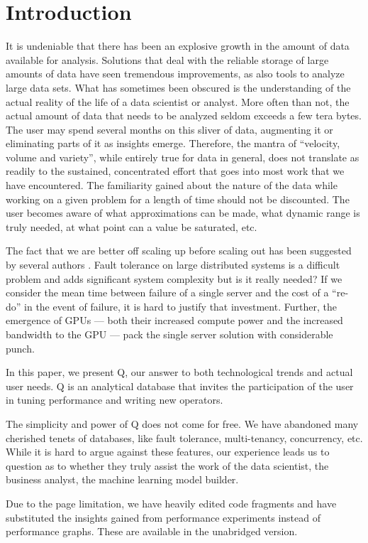 \section{Introduction}

It is undeniable that there has been an explosive growth in the 
amount of data available for analysis. Solutions that 
deal with the reliable storage of large amounts of data have seen tremendous
improvements, as also tools to analyze large data sets. What has sometimes been
obscured is the understanding of the actual reality of the life of a data
scientist or analyst. More often than not, the actual amount of data that needs
to be analyzed seldom exceeds a few tera bytes\cite{Dittrich2015}. The user may spend
several months on this sliver of data, augmenting it or eliminating parts of it
as insights emerge. Therefore, the mantra of ``velocity, volume and variety'',
while entirely true for data in general, does not translate as readily to the
sustained, concentrated effort that goes into most work that we have
encountered. The familiarity gained about the nature of the data 
while working on a given problem for a length of time should not be discounted. The
user becomes aware of what approximations can be made, what dynamic range is
truly needed, at what point can a value be saturated, etc.

The fact that we are better off scaling up before scaling out has been suggested
by several authors \cite{Rowstron2012,Dittrich2015}. 
Fault tolerance on large distributed systems is a difficult
problem and adds significant system complexity but is it really needed?
If we consider the mean time between failure of a single server and
the cost of a ``re-do'' in the event of failure,
it is hard to justify that investment. 
Further, the emergence of GPUs --- both their increased compute power and the
increased  bandwidth to the GPU --- pack the single server solution with
considerable punch.

In this paper, we present Q, our answer to both technological trends and actual
user needs. Q is an analytical database that invites the participation of the
user in tuning performance and writing new operators. 

The simplicity and power of Q does not come for free. We have abandoned many
cherished tenets of databases, like fault tolerance, multi-tenancy, concurrency,
etc. While it is hard to argue against these features, our experience leads us
to question as to whether they truly assist the work of the data scientist, the
business analyst, the machine learning model builder. 

Due to the page limitation, we have heavily edited code fragments and
have substituted the insights gained from performance experiments instead of
performance graphs. These are available in the unabridged version.
